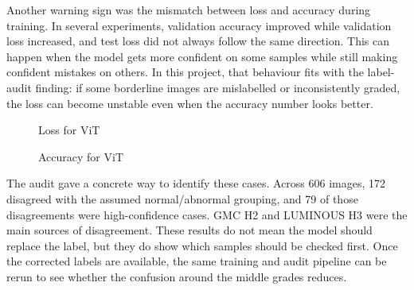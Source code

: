 Another warning sign was the mismatch between loss and accuracy during training. In several experiments, validation accuracy improved while validation loss increased, and test loss did not always follow the same direction. This can happen when the model gets more confident on some samples while still making confident mistakes on others. In this project, that behaviour fits with the label-audit finding: if some borderline images are mislabelled or inconsistently graded, the loss can become unstable even when the accuracy number looks better.

\begin{figure}[H]
    \centering
    \caption{Loss for ViT}
    \label{fig:training}
\end{figure}

\begin{figure}[H]
    \centering
    \caption{Accuracy for ViT}
    \label{fig:training_accuracy}
\end{figure}

The audit gave a concrete way to identify these cases. Across 606 images, 172 disagreed with the assumed normal/abnormal grouping, and 79 of those disagreements were high-confidence cases. GMC H2 and LUMINOUS H3 were the main sources of disagreement. These results do not mean the model should replace the label, but they do show which samples should be checked first. Once the corrected labels are available, the same training and audit pipeline can be rerun to see whether the confusion around the middle grades reduces.